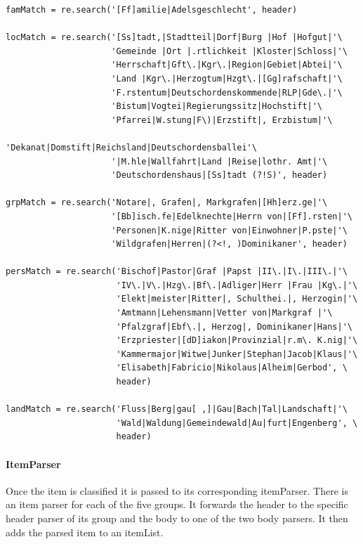 \begin{verbatim}
famMatch = re.search('[Ff]amilie|Adelsgeschlecht', header)

locMatch = re.search('[Ss]tadt,|Stadtteil|Dorf|Burg |Hof |Hofgut|'\
                     'Gemeinde |Ort |.rtlichkeit |Kloster|Schloss|'\
                     'Herrschaft|Gft\.|Kgr\.|Region|Gebiet|Abtei|'\
                     'Land |Kgr\.|Herzogtum|Hzgt\.|[Gg]rafschaft|'\
                     'F.rstentum|Deutschordenskommende|RLP|Gde\.|'\
                     'Bistum|Vogtei|Regierungssitz|Hochstift|'\
                     'Pfarrei|W.stung|F\)|Erzstift|, Erzbistum|'\
                     'Dekanat|Domstift|Reichsland|Deutschordensballei'\
                     '|M.hle|Wallfahrt|Land |Reise|lothr. Amt|'\
                     'Deutschordenshaus|[Ss]tadt (?!S)', header)

grpMatch = re.search('Notare|, Grafen|, Markgrafen|[Hh]erz.ge|'\
                     '[Bb]isch.fe|Edelknechte|Herrn von|[Ff].rsten|'\
                     'Personen|K.nige|Ritter von|Einwohner|P.pste|'\
                     'Wildgrafen|Herren|(?<!, )Dominikaner', header)

persMatch = re.search('Bischof|Pastor|Graf |Papst |II\.|I\.|III\.|'\
                      'IV\.|V\.|Hzg\.|Bf\.|Adliger|Herr |Frau |Kg\.|'\
                      'Elekt|meister|Ritter|, Schulthei.|, Herzogin|'\
                      'Amtmann|Lehensmann|Vetter von|Markgraf |'\
                      'Pfalzgraf|Ebf\.|, Herzog|, Dominikaner|Hans|'\
                      'Erzpriester|[dD]iakon|Provinzial|r.m\. K.nig|'\
                      'Kammermajor|Witwe|Junker|Stephan|Jacob|Klaus|'\
                      'Elisabeth|Fabricio|Nikolaus|Alheim|Gerbod', \
                      header)

landMatch = re.search('Fluss|Berg|gau[ ,]|Gau|Bach|Tal|Landschaft|'\
                      'Wald|Waldung|Gemeindewald|Au|furt|Engenberg', \
                      header)

\end{verbatim}


\paragraph{ItemParser}
Once the item is classified it is passed to its corresponding itemParser. There is an item parser for each of the five groups. It forwards the header to the specific header parser of its group and the body to one of the two body parsers. It then adds the parsed item to an itemList.

